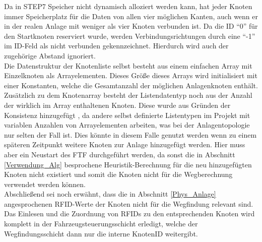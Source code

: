 			Da in \ac{STEP7} Speicher nicht dynamisch alloziert werden kann, hat jeder Knoten immer Speicherplatz für die Daten von allen vier möglichen Kanten, auch wenn er in der realen Anlage mit weniger als vier Knoten verbunden ist. Da die ID "`0"' für den Startknoten reserviert wurde, werden Verbindungsrichtungen durch eine "`-1"' im ID-Feld als nicht verbunden gekennzeichnet. Hierdurch wird auch der zugehörige Abstand ignoriert.
			\\[4pt]
			Die Datenstruktur der Knotenliste selbst besteht aus einem einfachen Array mit Einzelknoten als Arrayelementen. Dieses Größe dieses Arrays wird initialisiert mit einer Konstanten, welche die Gesamtanzahl der möglichen Anlagenknoten enthält. Zusätzlich zu dem Knotenarray besteht der Listendatentyp noch aus der Anzahl der wirklich im Array enthaltenen Knoten. Diese wurde aus Gründen der Konsistenz hinzugefügt , da andere selbst definierte Listentypen im Projekt mit variablen Anzahlen von Arrayelementen arbeiten, was bei der Anlagentopologie nur selten der Fall ist. Dies könnte in diesem Falle genutzt werden wenn zu einem späteren Zeitpunkt weitere Knoten zur Anlage hinzugefügt werden. Hier muss aber ein Neustart des \ac{FTF} durchgeführt werden, da sonst die in Abschnitt \ref{Verwendung_Alg} besprochene Heuristik-Berechnung für die neu hinzugefügten Knoten nicht existiert und somit die Knoten nicht für die Wegberechnung verwendet werden können.
			\\[4pt]
			Abschließend sei noch erwähnt, dass die in Abschnitt \ref{Phys_Anlage} angesprochenen \ac{RFID}-Werte der Knoten nicht für die Wegfindung relevant sind. Das Einlesen und die Zuordnung von \ac{RFID}s zu den entsprechenden Knoten wird komplett in der Fahrzeugsteuerungsschicht erledigt, welche der Wegfindungsschicht dann nur die interne KnotenID weitergibt.
			
